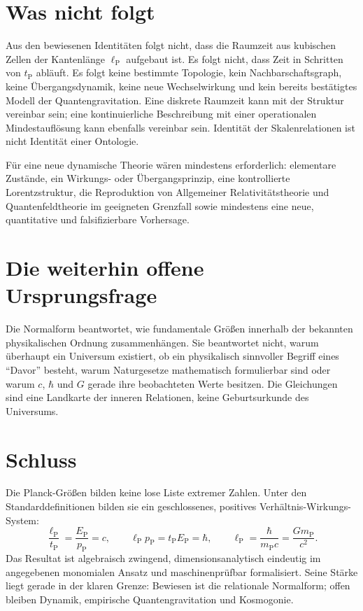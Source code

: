 \documentclass[11pt,a4paper]{article}
\newcommand{\lP}{\ell_{\mathrm P}}
\newcommand{\tP}{t_{\mathrm P}}
\newcommand{\mP}{m_{\mathrm P}}
\newcommand{\pP}{p_{\mathrm P}}
\newcommand{\EP}{E_{\mathrm P}}
\begin{document}
\section{Was nicht folgt}

Aus den bewiesenen Identitäten folgt nicht, dass die Raumzeit aus kubischen
Zellen der Kantenlänge $\lP$ aufgebaut ist. Es folgt nicht, dass Zeit in
Schritten von $\tP$ abläuft. Es folgt keine bestimmte Topologie, kein
Nachbarschaftsgraph, keine Übergangsdynamik, keine neue Wechselwirkung und kein
bereits bestätigtes Modell der Quantengravitation. Eine diskrete Raumzeit kann
mit der Struktur vereinbar sein; eine kontinuierliche Beschreibung mit einer
operationalen Mindestauflösung kann ebenfalls vereinbar sein. Identität der
Skalenrelationen ist nicht Identität einer Ontologie.

Für eine neue dynamische Theorie wären mindestens erforderlich: elementare
Zustände, ein Wirkungs- oder Übergangsprinzip, eine kontrollierte
Lorentzstruktur, die Reproduktion von Allgemeiner Relativitätstheorie und
Quantenfeldtheorie im geeigneten Grenzfall sowie mindestens eine neue,
quantitative und falsifizierbare Vorhersage.

\section{Die weiterhin offene Ursprungsfrage}

Die Normalform beantwortet, wie fundamentale Größen innerhalb der bekannten
physikalischen Ordnung zusammenhängen. Sie beantwortet nicht, warum überhaupt
ein Universum existiert, ob ein physikalisch sinnvoller Begriff eines
``Davor'' besteht, warum Naturgesetze mathematisch formulierbar sind oder warum
$c$, $\hbar$ und $G$ gerade ihre beobachteten Werte besitzen. Die Gleichungen
sind eine Landkarte der inneren Relationen, keine Geburtsurkunde des
Universums.

\section{Schluss}

Die Planck-Größen bilden keine lose Liste extremer Zahlen. Unter den
Standarddefinitionen bilden sie ein geschlossenes, positives
Verhältnis-Wirkungs-System:
\[
 \frac{\lP}{\tP}=\frac{\EP}{\pP}=c,
 \qquad
 \lP\pP=\tP\EP=\hbar,
 \qquad
 \lP=\frac{\hbar}{\mP c}=\frac{G\mP}{c^2}.
\]
Das Resultat ist algebraisch zwingend, dimensionsanalytisch eindeutig im
angegebenen monomialen Ansatz und maschinenprüfbar formalisiert. Seine Stärke
liegt gerade in der klaren Grenze: Bewiesen ist die relationale Normalform;
offen bleiben Dynamik, empirische Quantengravitation und Kosmogonie.
\end{document}
